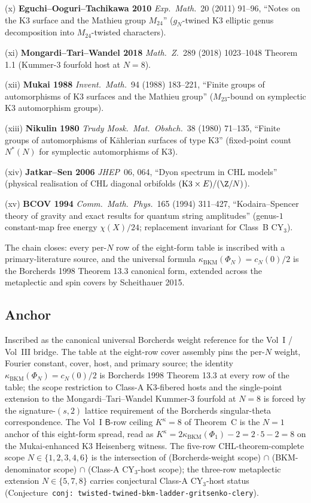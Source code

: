 (x) \textbf{Eguchi--Ooguri--Tachikawa 2010} \emph{Exp.\ Math.}~20
(2011) 91--96, ``Notes on the K3 surface and the Mathieu group
$M_{24}$'' ($g_N$-twined K3 elliptic genus decomposition into
$M_{24}$-twisted characters).

(xi) \textbf{Mongardi--Tari--Wandel 2018} \emph{Math.\ Z.}~289
(2018) 1023--1048 Theorem 1.1 (Kummer-$3$ fourfold host at
$N = 8$).

(xii) \textbf{Mukai 1988} \emph{Invent.\ Math.}~94 (1988)
183--221, ``Finite groups of automorphisms of K3 surfaces and the
Mathieu group'' ($M_{23}$-bound on symplectic K3 automorphism
groups).

(xiii) \textbf{Nikulin 1980} \emph{Trudy Mosk.\ Mat.\ Obshch.}~38
(1980) 71--135, ``Finite groups of automorphisms of K\"ahlerian
surfaces of type K3'' (fixed-point count $N^*(N)$ for symplectic
automorphisms of K3).

(xiv) \textbf{Jatkar--Sen 2006} \emph{JHEP}~06, 064, ``Dyon
spectrum in CHL models'' (physical realisation of CHL diagonal
orbifolds $(\mathrm{K3} \times E)/(\Z/N)$).

(xv) \textbf{BCOV 1994} \emph{Comm.\ Math.\ Phys.}~165 (1994)
311--427, ``Kodaira--Spencer theory of gravity and exact results
for quantum string amplitudes'' (genus-$1$ constant-map free
energy $\chi(X)/24$; replacement invariant for Class~B CY$_3$).

The chain closes: every per-$N$ row of the eight-form table is
inscribed with a primary-literature source, and the universal
formula $\kappa_{\mathrm{BKM}}(\Phi_N) = c_N(0)/2$ is the
Borcherds 1998 Theorem 13.3 canonical form, extended across the
metaplectic and spin covers by Scheithauer 2015.

\subsection*{Anchor}

Inscribed as the canonical universal Borcherds weight reference
for the Vol~I / Vol~III bridge. The table at the eight-row cover
assembly pins the per-$N$ weight, Fourier constant, cover, host,
and primary source; the identity
$\kappa_{\mathrm{BKM}}(\Phi_N) = c_N(0)/2$ is Borcherds 1998
Theorem 13.3 at every row of the table; the scope restriction to
Class-A K3-fibered hosts and the single-point extension to the
Mongardi--Tari--Wandel Kummer-$3$ fourfold at $N = 8$ is forced
by the signature-$(s, 2)$ lattice requirement of the Borcherds
singular-theta correspondence. The Vol~I $\mathsf{B}$-row
ceiling $K^\kappa = 8$ of Theorem~C is the $N = 1$ anchor of
this eight-form spread, read as
$K^\kappa = 2 \kappa_{\mathrm{BKM}}(\Phi_1) - 2 = 2 \cdot 5 - 2 = 8$
on the Mukai-enhanced K3 Heisenberg witness. The five-row
CHL-theorem-complete scope $N \in \{1, 2, 3, 4, 6\}$ is the
intersection of (Borcherds-weight scope) $\cap$
(BKM-denominator scope) $\cap$ (Class-A CY$_3$-host scope); the
three-row metaplectic extension $N \in \{5, 7, 8\}$ carries
conjectural Class-A CY$_3$-host status (Conjecture~\texttt{conj:
twisted-twined-bkm-ladder-gritsenko-clery}).

